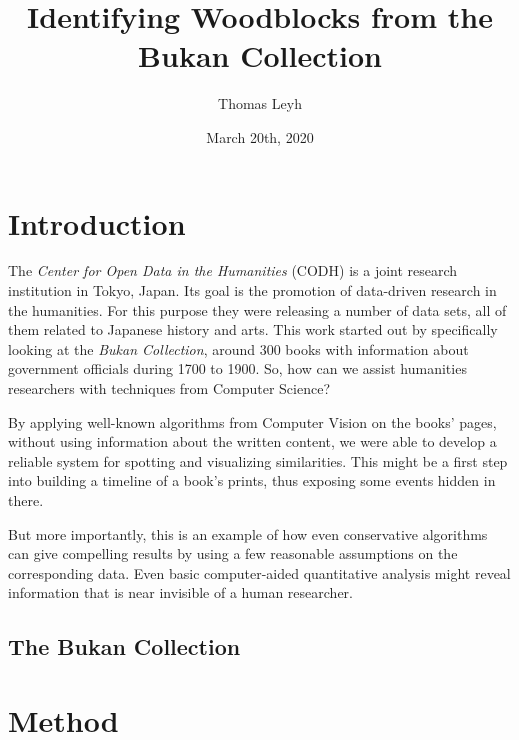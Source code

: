 \documentclass{article}
\title{Identifying Woodblocks from the Bukan Collection}
\author{Thomas Leyh}
\date{March 20th, 2020}
\begin{document}
\maketitle

\section{Introduction}

The \emph{Center for Open Data in the Humanities} (CODH) is a joint research institution in Tokyo, Japan. Its goal is the promotion of data-driven research in the humanities.\cite{kitamoto2017codh} For this purpose they were releasing a number of data sets, all of them related to Japanese history and arts. This work started out by specifically looking at the \emph{Bukan Collection}\cite{}, around 300 books with information about government officials during 1700 to 1900. So, how can we assist humanities researchers with techniques from Computer Science?

By applying well-known algorithms from Computer Vision on the books' pages, without using information about the written content, we were able to develop a reliable system for spotting and visualizing similarities. This might be a first step into building a timeline of a book's prints, thus exposing some events hidden in there.

But more importantly, this is an example of how even conservative algorithms can give compelling results by using a few reasonable assumptions on the corresponding data. Even basic computer-aided quantitative analysis might reveal information that is near invisible of a human researcher.

\subsection{The Bukan Collection}

\section{Method}

\printbibliography
\end{document}
